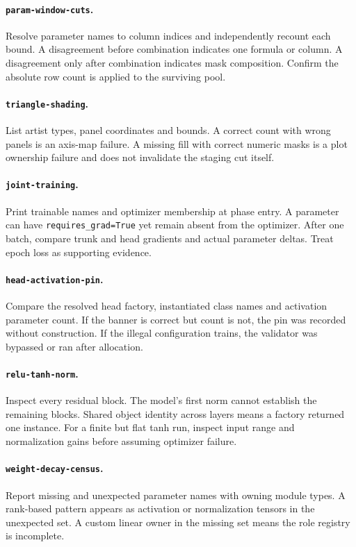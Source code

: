 \documentclass[10pt,aps,prd,twocolumn,nofootinbib]{revtex4-2}
\newcommand{\code}[1]{\texttt{#1}}
\begin{document}
\paragraph{\code{param-window-cuts}.}
Resolve parameter names to column indices and independently recount each
bound.  A disagreement before combination indicates one formula or column.
A disagreement only after combination indicates mask composition.  Confirm
the absolute row count is applied to the surviving pool.

\paragraph{\code{triangle-shading}.}
List artist types, panel coordinates and bounds.  A correct count with wrong
panels is an axis-map failure.  A missing fill with correct numeric masks is a
plot ownership failure and does not invalidate the staging cut itself.

\paragraph{\code{joint-training}.}
Print trainable names and optimizer membership at phase entry.  A parameter
can have \code{requires\_grad=True} yet remain absent from the optimizer.
After one batch, compare trunk and head gradients and actual parameter deltas.
Treat epoch loss as supporting evidence.

\paragraph{\code{head-activation-pin}.}
Compare the resolved head factory, instantiated class names and activation
parameter count.  If the banner is correct but count is not, the pin was
recorded without construction.  If the illegal configuration trains, the
validator was bypassed or ran after allocation.

\paragraph{\code{relu-tanh-norm}.}
Inspect every residual block.  The model's first norm cannot establish the
remaining blocks.  Shared object identity across layers means a factory
returned one instance.  For a
finite but flat tanh run, inspect input range and normalization gains before
assuming optimizer failure.

\paragraph{\code{weight-decay-census}.}
Report missing and unexpected parameter names with owning module types.  A
rank-based pattern appears as activation or normalization tensors in the
unexpected set.  A custom linear owner in the missing set means the role
registry is incomplete.
\end{document}
